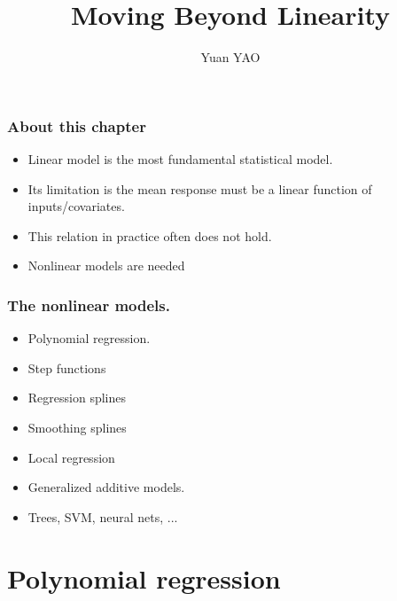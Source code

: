 \documentclass{beamer}
\title[Chapter 7]{Moving Beyond Linearity}
\author{Yuan YAO}
\institute[HKUST]
{
	Chapter 7 \\ 
	\medskip
	\textit{ } 
}
\begin{document}
	 	
	 	\begin{frame}
	 		\titlepage %
	 	\end{frame}
	
 \begin{frame}
 	\frametitle{ }
 	\tableofcontents
 \end{frame}
           
      
      \begin{frame}
      	\frametitle{About this chapter}
      	\begin{itemize}
      		\item  Linear model is the most fundamental statistical model.
      		\item  Its limitation is the mean response must be a linear function of inputs/covariates.
      		\item  This relation in practice often does not hold.
      		\item  Nonlinear models are needed  
        	\end{itemize}
        \end{frame}
        
       
       \begin{frame}
       	\frametitle{The nonlinear models. }
       	\begin{itemize}
       		\item Polynomial regression.
       		\item Step functions 
       		\item Regression splines
       		\item Smoothing splines
       		\item Local regression
       		\item Generalized additive models.
       		\item Trees, SVM, neural nets, ...	
       	\end{itemize}
       \end{frame} 
       
        
       
\section{Polynomial regression}
        
\end{document}
